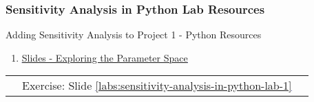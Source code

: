 \documentclass[handout, 11pt]{beamer}
\begin{document}
\begin{frame}
\frametitle{Sensitivity Analysis in Python Lab Resources}
{
\begin{block}{Adding Sensitivity Analysis to Project 1 - Python Resources}
\begin{enumerate}
\item \textcolor{blue}{\underline{\href{https://nickderobertis.github.io/fin-model-course/\_static/generated/pdfs/S7 Exploring the Parameter Space.pdf}{Slides - Exploring the Parameter Space}}}
\end{enumerate}
\vfill
\begin{tabular*}{\textwidth}{@{\extracolsep{\fill}}ccc}
\toprule
\hfill & Exercise: Slide \textcolor{blue}{\underline{\ref{labs:sensitivity-analysis-in-python-lab-1}}} & \hfill\\

\end{tabular*}
\end{block}
}
\label{labs:sensitivity-analysis-in-python-lab-1-resources}
\end{frame}
\setcounter{framenumber}{\value{finalframe}}
\end{document}
